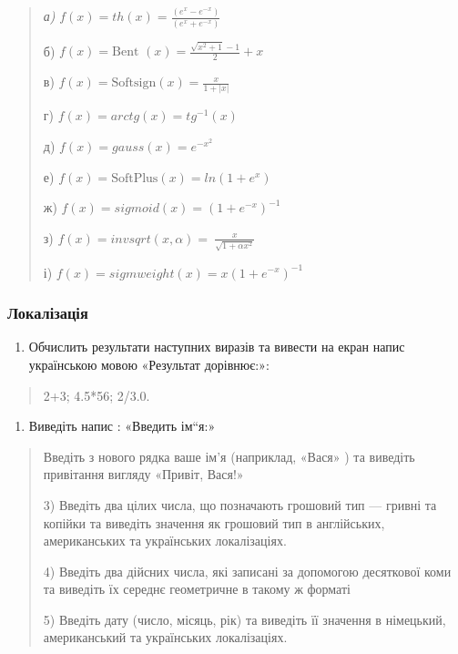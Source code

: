 \documentclass[]{article}
\begin{document}
\begin{quote}
\emph{а)}
\(f\left( x \right) = th\left( x \right) = \frac{(e^{x} - e^{- x})}{(e^{x} + e^{- x})}\)

б)
\(f\left( x \right) = \text{Bent\ }\left( x \right) = \frac{\sqrt{x^{2} + 1} - 1}{2} + x\)

в)
\(f\left( x \right) = \text{Softsign}\left( x \right) = \frac{x}{1 + \left| x \right|}\)

г) \(f\left( x \right) = arctg\left( x \right) = tg^{- 1}(x)\)

д) \(f\left( x \right) = gauss\left( x \right) = e^{- x^{2}}\)

е)
\(f\left( x \right) = \text{SoftPlus}\left( x \right) = ln(1 + e^{x})\)

ж) \(f\left( x \right) = sigmoid\left( x \right) = (1 + e^{- x})^{- 1}\)

з)
\(f\left( x \right) = invsqrt(x,\alpha) = \ \frac{x}{\sqrt{1 + \alpha x^{2}}}\)

і)
\(f\left( x \right) = sigmweight\left( x \right) = x(1 + e^{- x})^{- 1}\)
\end{quote}

\subsubsection{Локалізація}\label{ux43bux43eux43aux430ux43bux456ux437ux430ux446ux456ux44f}

\begin{enumerate}
\def\labelenumi{\arabic{enumi})}
\item
  Обчислить результати наступних виразів та вивести на екран напис
  українською мовою «Результат дорівнює:»:
\end{enumerate}

\begin{quote}
2+3; 4.5*56; 2/3.0.
\end{quote}

\begin{enumerate}
\def\labelenumi{\arabic{enumi})}
\item
  Виведіть напис : «Введить ім``я:»
\end{enumerate}

\begin{quote}
Введіть з нового рядка ваше ім'я (наприклад, «Вася» ) та виведіть
привітання вигляду «Привіт, Вася!»

3) Введіть два цілих числа, що позначають грошовий тип --- гривні та
копійки та виведіть значення як грошовий тип в англійських,
американських та українських локалізаціях.

4) Введіть два дійсних числа, які записані за допомогою десяткової коми
та виведіть їх середнє геометричне в такому ж форматі

5) Введіть дату (число, місяць, рік) та виведіть її значення в
німецький, американський та українських локалізаціях.
\end{quote}
\end{document}
